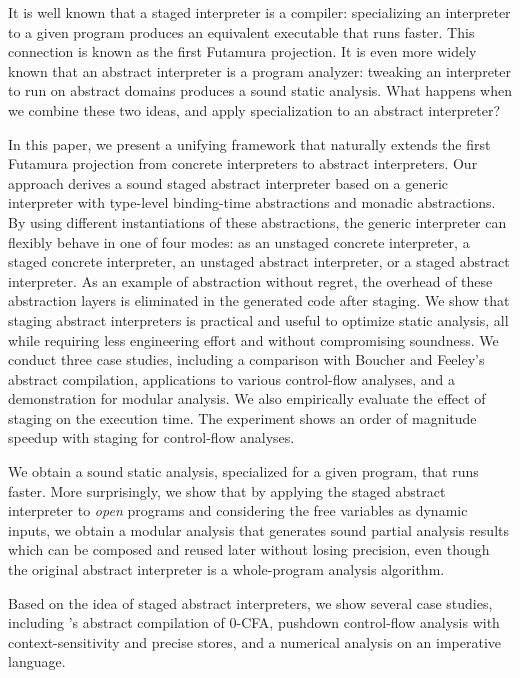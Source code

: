 It is well known that a staged interpreter is a compiler: specializing an
interpreter to a given program produces an equivalent executable that runs faster.
This connection is known as the first Futamura projection.
It is even more widely known that an abstract interpreter is a program analyzer:
tweaking an interpreter to run on abstract domains produces a sound static
analysis. What happens when we combine these two ideas, and apply specialization to
an abstract interpreter?

In this paper, we present a unifying framework that naturally extends the first
Futamura projection from concrete interpreters to abstract interpreters. Our
approach derives a sound staged abstract interpreter based on a
generic interpreter with type-level binding-time abstractions and
monadic abstractions. By using different instantiations of these abstractions,
the generic interpreter can flexibly behave in one of four modes: as an unstaged
concrete interpreter, a staged concrete interpreter, an unstaged abstract
interpreter, or a staged abstract interpreter. As an example of
abstraction without regret, the overhead of these abstraction layers is
eliminated in the generated code after staging. We show that staging abstract
interpreters is practical and useful to optimize static analysis, all while
requiring less engineering effort and without compromising soundness. We conduct
three case studies, including a comparison with Boucher and Feeley's abstract
compilation, applications to various control-flow analyses, and a demonstration
for modular analysis. We also empirically evaluate the effect
of staging on the execution time. The experiment shows an order of magnitude
speedup with staging for control-flow analyses.

\iffalse
We obtain a sound static analysis, specialized for
a given program, that runs faster. More surprisingly, we show that by applying
the staged abstract interpreter to \textit{open} programs and considering the
free variables as dynamic inputs, we obtain a modular analysis that generates
sound partial analysis results which can be composed and reused later without
losing precision, even though the original abstract interpreter is a
whole-program analysis algorithm.

Based on the idea of staged abstract interpreters, we show several case studies,
including \citeauthor{Boucher:1996:ACN:647473.727587}'s abstract compilation of
0-CFA, pushdown control-flow analysis with context-sensitivity and precise
stores, and a numerical analysis on an imperative language.

